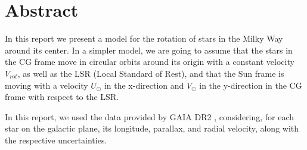 \section*{Abstract}

In this report we present a model for the rotation of stars in the Milky Way around its center.
In a simpler model, we are going to assume that the stars in the CG frame move in circular orbits around its origin with a constant velocity $V_{rot}$, as well as the LSR (Local Standard of Rest), and that the Sun frame is moving with a velocity $U_{\odot}$ in the x-direction and $V_{\odot}$ in the y-direction in the CG frame with respect to the LSR.



In this report, we used the data provided by GAIA DR2 \cite{GAIADR2}, considering, for each star on the galactic plane, its longitude, parallax, and radial velocity, along with the respective uncertainties.

